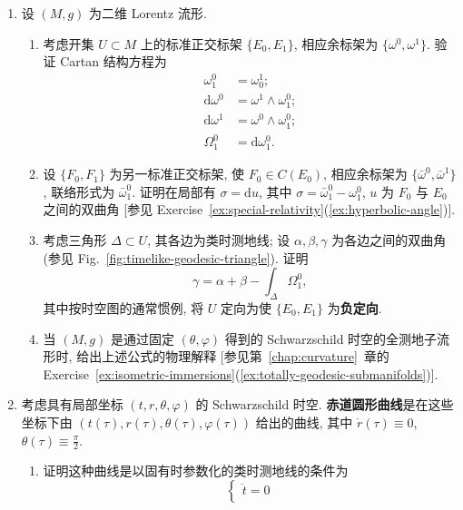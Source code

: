 \begin{RiemannExercise}\label{ex:schwarzschild-solution}
\begin{enumerate}[label=(\arabic*),ref=\arabic*,leftmargin=*]
\item\label{ex:timelike-geodesic-triangles}
设 $(M,g)$ 为二维 Lorentz 流形.
\begin{enumerate}[label=(\alph*),leftmargin=*]
\item 考虑开集 $U\subset M$ 上的标准正交标架 $\{E_0,E_1\}$, 相应余标架为 $\{\omega^0,\omega^1\}$. 验证 Cartan 结构方程为
\begin{align*}
  \omega_1^0&=\omega_0^1;\\
  \mathrm{d}\omega^0&=\omega^1\wedge\omega_1^0;\\
  \mathrm{d}\omega^1&=\omega^0\wedge\omega_1^0;\\
  \Omega_1^0&=\mathrm{d}\omega_1^0.
\end{align*}
\item 设 $\{F_0,F_1\}$ 为另一标准正交标架, 使 $F_0\in C(E_0)$, 相应余标架为 $\{\bar\omega^0,\bar\omega^1\}$, 联络形式为 $\bar\omega_1^0$. 证明在局部有 $\sigma=\mathrm{d}u$, 其中 $\sigma=\bar\omega_1^0-\omega_1^0$, \label{idx:hyperbolic-angle-between-orthonormal-frames}$u$ 为 $F_0$ 与 $E_0$ 之间的双曲角 [参见 Exercise~\ref{ex:special-relativity}(\ref{ex:hyperbolic-angle})].
\item 考虑三角形 $\Delta\subset U$, 其各边为类时测地线; 设 $\alpha,\beta,\gamma$ 为各边之间的双曲角 (参见 Fig.~\ref{fig:timelike-geodesic-triangle}). 证明
\[
  \gamma=\alpha+\beta-\int_\Delta\Omega_1^0,
\]
其中按时空图的通常惯例, 将 $U$ 定向为使 $\{E_0,E_1\}$ 为\textbf{负定向}.
\item 当 $(M,g)$ 是通过固定 $(\theta,\varphi)$ 得到的 Schwarzschild 时空的全测地子流形时, 给出上述公式的物理解释 [参见第~\ref{chap:curvature}~章的 Exercise~\ref{ex:isometric-immersions}(\ref{ex:totally-geodesic-submanifolds})].
\end{enumerate}
\item\label{ex:equatorial-circular-geodesics-in-schwarzschild}
考虑具有局部坐标 $(t,r,\theta,\varphi)$ 的 Schwarzschild 时空. \textbf{赤道圆形曲线}是在这些坐标下由 $(t(\tau),r(\tau),\theta(\tau),\varphi(\tau))$ 给出的曲线, 其中 $\dot r(\tau)\equiv0$, $\theta(\tau)\equiv\frac{\pi}{2}$.
\begin{enumerate}[label=(\alph*),leftmargin=*]
\item 证明这种曲线是以固有时参数化的类时测地线的条件为
\[
  \begin{cases}
    \ddot t=0\\

\end{cases}\]
\end{enumerate}
\end{enumerate}
\end{RiemannExercise}
